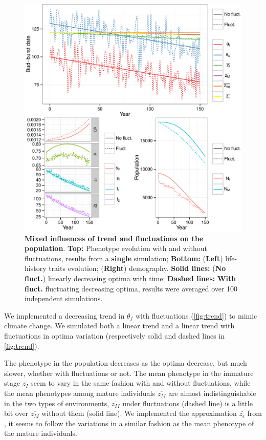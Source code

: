 \begin{figure}[ht!]
	\centering
	\includegraphics[scale=1]{Figures/Trend.pdf}
	\caption{\textbf{Mixed influences of trend and fluctuations on the population}. \textbf{Top:} Phenotype evolution with and without fluctuations, results from a \textbf{single} simulation; \textbf{Bottom:} (\textbf{Left}) life-history traits evolution; (\textbf{Right}) demography. \textbf{Solid lines:} (\textbf{No fluct.}) linearly decreasing optima with time; \textbf{Dashed lines:} \textbf{With fluct.} fluctuating decreasing optima, results were averaged over 100 independent simulations.}
	\label{fig:trend}
\end{figure}

We implemented a decreasing trend in $\theta_f$ with fluctuations (\autoref{fig:trend}) to mimic climate change. We simulated both a linear trend and a linear trend with fluctuations in optima variation (respectively solid and dashed lines in \autoref{fig:trend}).

The phenotype in the population decreases as the optima decrease, but much slower, whether with fluctuations or not. The mean phenotype in the immature stage $\overline{z_I}$ seem to vary in the same fashion with and without fluctuations, while the mean phenotypes among mature individuals $\overline{z_M}$ are almost indistinguishable in the two types of environments, $\overline{z_M}$ under fluctuations (dashed line) is a little bit over $\overline{z_M}$ without them (solid line). We implemented the approximation $\overline{z_\epsilon}$ from \citep{engen_evolution_2011}, it seems to follow the variations in a similar fashion as the mean phenotype of the mature individuals.


